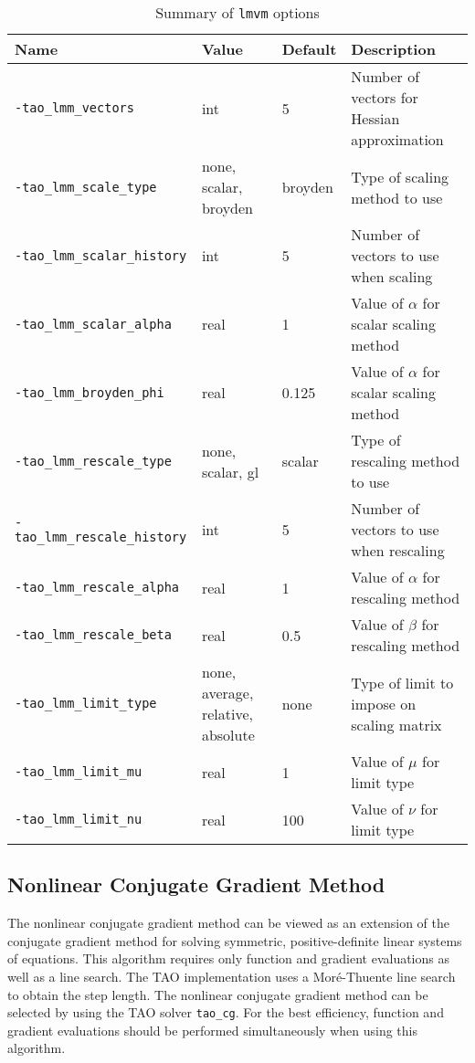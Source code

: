 \begin{table}[htb]
\caption{Summary of {\tt lmvm} options}
\label{table:lmvmoptions}
\vspace{5mm}
\begin{tabular}{l|p{1.5in}|l|p{2.0in}}
\hline
Name \rule{0pt}{2.6ex} & Value & Default & Description \\
\hline
{\tt -tao\_lmm\_vectors} \rule{0pt}{2.6ex} & int & 5 & Number of vectors for Hessian approximation \\
{\tt -tao\_lmm\_scale\_type} & none, scalar, broyden & broyden & Type of scaling method to use \\
{\tt -tao\_lmm\_scalar\_history} & int & 5 & Number of vectors to use when scaling \\
{\tt -tao\_lmm\_scalar\_alpha} & real & 1 & Value of $\alpha$ for scalar scaling method \\
{\tt -tao\_lmm\_broyden\_phi} & real & 0.125 & Value of $\alpha$ for scalar scaling method \\
{\tt -tao\_lmm\_rescale\_type} & none, scalar, gl & scalar & Type of rescaling method to use \\
{\tt -tao\_lmm\_rescale\_history} & int & 5 & Number of vectors to use when rescaling \\
{\tt -tao\_lmm\_rescale\_alpha} & real & 1 & Value of $\alpha$ for rescaling method \\
{\tt -tao\_lmm\_rescale\_beta} & real & 0.5 & Value of $\beta$ for rescaling method \\
{\tt -tao\_lmm\_limit\_type} & none, average, relative, absolute & none & Type of limit to impose on scaling matrix \\
{\tt -tao\_lmm\_limit\_mu} & real & 1 & Value of $\mu$ for limit type\\
{\tt -tao\_lmm\_limit\_nu} & real & 100 & Value of $\nu$ for limit type\\
\hline
\end{tabular}
\end{table}
\afterpage{\clearpage}

\subsection{Nonlinear Conjugate Gradient Method}

The nonlinear conjugate gradient method can be viewed as an extension of the 
conjugate gradient method for solving symmetric, positive-definite linear 
systems of equations.  This algorithm requires only function and gradient 
evaluations as well as a line search.  The TAO implementation uses a 
Mor\'{e}-Thuente line search to obtain the step length.  The nonlinear 
conjugate gradient method can be selected by using the TAO solver 
{\tt tao\_cg}.  For the best efficiency, function and gradient evaluations 
should be performed simultaneously when using this algorithm.

